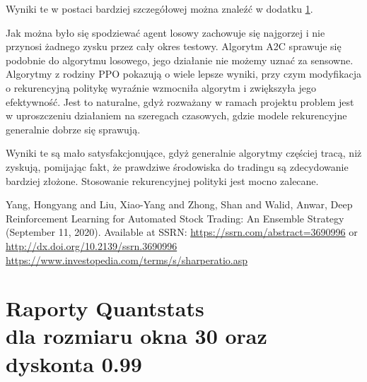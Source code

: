 \documentclass[12pt,a4paper]{article}
\begin{document}
Wyniki te w postaci bardziej szczegółowej można znaleźć w dodatku \ref{app:reports}.

\medskip

Jak można było się spodziewać agent losowy zachowuje się najgorzej i
nie przynosi żadnego zysku przez cały okres testowy. Algorytm A2C
sprawuje się podobnie do algorytmu losowego, jego działanie nie możemy
uznać za sensowne. Algorytmy z rodziny PPO pokazują o wiele lepsze
wyniki, przy czym modyfikacja o rekurencyjną politykę wyraźnie wzmocniła
algorytm i zwiększyła jego efektywność. Jest to naturalne, gdyż
rozważany w ramach projektu problem jest w uproszczeniu działaniem
na szeregach czasowych, gdzie modele rekurencyjne generalnie dobrze się
sprawują.

Wyniki te są mało satysfakcjonujące, gdyż generalnie algorytmy częściej
tracą, niż zyskują, pomijając fakt, że prawdziwe środowiska do
tradingu są zdecydowanie bardziej złożone.
Stosowanie rekurencyjnej polityki jest mocno zalecane.


\pagebreak
\begin{thebibliography}{9}
  Yang, Hongyang and Liu, Xiao-Yang and Zhong, Shan and Walid, Anwar,
  Deep Reinforcement Learning for Automated Stock Trading: An Ensemble
  Strategy (September 11, 2020). Available at SSRN:
  \href{https://ssrn.com/abstract=3690996}{https://ssrn.com/abstract=3690996}
  or \href{http://dx.doi.org/10.2139/ssrn.3690996}{http://dx.doi.org/10.2139/ssrn.3690996}
    \url{https://www.investopedia.com/terms/s/sharperatio.asp}
\end{thebibliography}

\pagebreak
\appendix
\section{Raporty Quantstats \\
  dla rozmiaru okna 30 oraz dyskonta 0.99}\label{app:reports}
\end{document}
